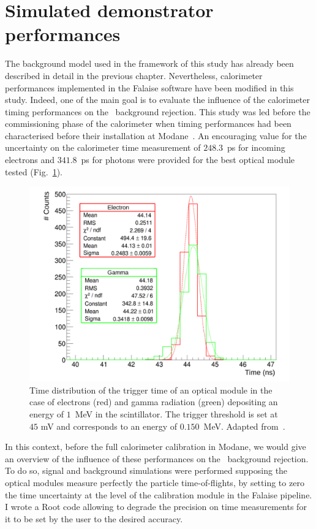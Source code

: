 \section{Simulated demonstrator performances}

The background model used in the framework of this study has already been described in detail in the previous chapter.
Nevertheless, calorimeter performances implemented in the Falaise software have been modified in this study.
Indeed, one of the main goal is to evaluate the influence of the calorimeter timing performances on the \Tl\ background rejection.
This study was led before the commissioning phase of the calorimeter when timing performances had been characterised before their installation at Modane~\cite{HuberThesis}.
An encouraging value for the uncertainty on the calorimeter time measurement of $248.3$~ps for incoming electrons and $341.8$~ps for photons were provided for the best optical module tested (Fig.~\ref{fig:Arnaud_RMS_PM}).
\begin{figure}[!h]
  \centering
  \includegraphics[width=13cm]{timedifference/fig_timediff/Arnaud_RMS_PM.pdf}
  \caption{Time distribution of the trigger time of an optical module in the case of electrons (red) and gamma radiation (green) depositing an energy of $1$~MeV in the scintillator.
    The trigger threshold is set at $45$ mV and corresponds to an energy of $0.150$~MeV.
    Adapted from~\cite{HuberThesis}.
  \label{fig:Arnaud_RMS_PM}}
\end{figure}

In this context, before the full calorimeter calibration in Modane, we would give an overview of the influence of these performances on the \Tl\ background rejection.
To do so, signal and background simulations were performed supposing the optical modules measure perfectly the particle time-of-flights, by setting to zero the time uncertainty at the level of the calibration module in the Falaise pipeline.
I wrote a Root code allowing to degrade the precision on time measurements for it to be set by the user to the desired accuracy.

